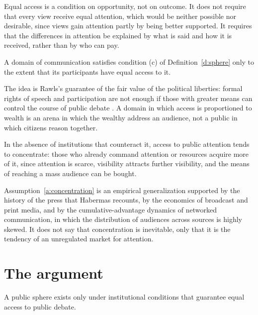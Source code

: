\documentclass{situationist-preprint}
\begin{document}
Equal access is a condition on opportunity, not on outcome. It does not require that every view receive equal attention, which would be neither possible nor desirable, since views gain attention partly by being better supported. It requires that the differences in attention be explained by what is said and how it is received, rather than by who can pay.

\begin{principle}[Openness]\label{p:openness}
A domain of communication satisfies condition (c) of Definition~\ref{d:sphere} only to the extent that its participants have equal access to it.
\end{principle}

The idea is Rawls's guarantee of the fair value of the political liberties: formal rights of speech and participation are not enough if those with greater means can control the course of public debate \citep[\S36]{Rawls1971}. A domain in which access is proportioned to wealth is an arena in which the wealthy address an audience, not a public in which citizens reason together.

\begin{assumption}[Concentration]\label{a:concentration}
In the absence of institutions that counteract it, access to public attention tends to concentrate: those who already command attention or resources acquire more of it, since attention is scarce, visibility attracts further visibility, and the means of reaching a mass audience can be bought.
\end{assumption}

Assumption~\ref{a:concentration} is an empirical generalization supported by the history of the press that Habermas recounts, by the economics of broadcast and print media, and by the cumulative-advantage dynamics of networked communication, in which the distribution of audiences across sources is highly skewed. It does not say that concentration is inevitable, only that it is the tendency of an unregulated market for attention.

\section{The argument}

\begin{proposition}[Necessity]\label{p:necessity}
A public sphere exists only under institutional conditions that guarantee equal access to public debate.
\end{proposition}
\end{document}
